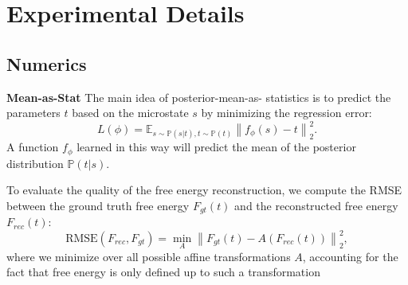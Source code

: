 \documentclass{article}
\theoremstyle{plain}
\theoremstyle{definition}
\theoremstyle{remark}
\begin{document}
\section{Experimental Details}
\label{sec:appendix_experiments}

\subsection{Numerics}
\label{subsec:numerics}


\textbf{Mean-as-Stat} The main idea of posterior-mean-as-
statistics is to predict the parameters $t$ based on the microstate $s$ by minimizing the regression error:
\begin{equation}
    L(\phi) = \mathbb{E}_{s\sim \mathbb{P}(s|t), t \sim \mathbb{P}(t) }\left\| f_{\phi}(s)-t \right\|^{2}_{2}.
\end{equation}
A function $f_{\phi}$ learned in this way will predict the mean of the posterior distribution $\mathbb{P}(t|s)$.

To evaluate the quality of the free energy reconstruction, we compute the RMSE between the ground truth free energy $F_{gt}(t)$ and the reconstructed free energy $F_{rec}(t)$:
\begin{equation}
    \text{RMSE}(F_{rec}, F_{gt}) = \min_{A} \left\| F_{gt}(t) - A(F_{rec}(t)) \right\|_{2}^{2},
\end{equation}
where we minimize over all possible affine transformations \( A \), accounting for the fact that free energy is only defined up to such a transformation
\end{document}
